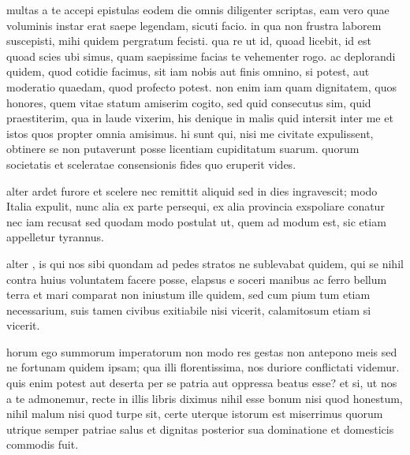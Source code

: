 


 multas a te accepi epistulas eodem die omnis diligenter scriptas, eam vero quae voluminis instar erat saepe legendam, sicuti facio. in qua non frustra laborem suscepisti, mihi quidem pergratum fecisti. qua re ut id, quoad licebit, id est quoad scies ubi simus, quam saepissime facias te vehementer rogo. ac deplorandi quidem, quod cotidie facimus, sit iam nobis aut finis omnino, si potest, aut moderatio quaedam, quod profecto potest. non enim iam quam dignitatem, quos honores, quem vitae statum amiserim cogito, sed quid consecutus sim, quid praestiterim, qua in laude vixerim, his denique in malis quid intersit inter me et istos quos propter omnia amisimus. hi sunt qui, nisi me civitate expulissent, obtinere se non putaverunt posse licentiam cupiditatum suarum. quorum societatis et sceleratae consensionis fides quo eruperit vides.

 alter ardet furore et scelere nec remittit aliquid sed in dies ingravescit; modo Italia expulit, nunc alia ex parte persequi, ex alia provincia exspoliare conatur nec iam recusat sed quodam modo postulat ut, quem ad modum est, sic etiam appelletur tyrannus.

 alter , is qui nos sibi quondam ad pedes stratos ne sublevabat quidem, qui se nihil contra huius voluntatem facere posse, elapsus e soceri manibus ac ferro bellum terra et mari comparat non iniustum ille quidem, sed cum pium tum etiam necessarium, suis tamen civibus exitiabile nisi vicerit, calamitosum etiam si vicerit.

 horum ego summorum imperatorum non modo res gestas non antepono meis sed ne fortunam quidem ipsam; qua illi florentissima, nos duriore conflictati videmur. quis enim potest aut deserta per se patria aut oppressa beatus esse? et si, ut nos a te admonemur, recte in illis libris diximus nihil esse bonum nisi quod honestum, nihil malum nisi quod turpe sit, certe uterque istorum est miserrimus quorum utrique semper patriae salus et dignitas posterior sua dominatione et domesticis commodis fuit.

